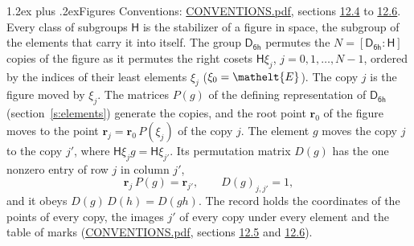 \documentclass[10pt,a4paper]{article}
\makeatletter
\renewcommand\section{\@startsection{section}{1}{\z@}{-3ex plus -1ex minus -.2ex}%
  {1.2ex plus .2ex}{\normalfont\large\sffamily\bfseries\color{parttitle}}}
\numberwithin{equation}{section}
\newcommand{\eltfont}[1]{{\let\sigma\eltsigma\mathelt{#1}}}
\newcommand{\grp}[1]{\mathsf{#1}}
\newcommand{\cls}[1]{\eltfont{#1}}
\newcommand{\pointr}{\mathbf{r}}
\makeatother
\begin{document}
\section{Figures}\label{s:permutation}
Conventions: \href{../../CONVENTIONS.pdf}{CONVENTIONS.pdf}, sections \href{../../CONVENTIONS.pdf\#conv.12.4}{12.4} to \href{../../CONVENTIONS.pdf\#conv.12.6}{12.6}.
Every class of subgroups $\grp{H}$ is the stabilizer of a figure in space, the subgroup of the elements that carry it into itself. \label{n:local.orbit.size}\label{n:element.coset.least}\label{n:index.coset}The group $\grp{D_{6h}}$ permutes the $N = [\grp{D_{6h}} : \grp{H}]$ copies of the figure as it permutes the right cosets $\grp{H}\xi_j$, $j = 0, 1, \dots, N - 1$, ordered by the indices of their least elements $\xi_j$ ($\xi_0 = \cls{E}$). The copy $j$ is the figure moved by $\xi_j$. The matrices $P(g)$ of the defining representation of $\grp{D_{6h}}$ (section~\ref{s:elements}) generate the copies, and the root point $\pointr_0$ of the figure moves to the point $\pointr_j = \pointr_0\, P(\xi_j)$ of the copy $j$. \label{n:local.coset.image}The element $g$ moves the copy $j$ to the copy $j'$, where $\grp{H}\xi_j g = \grp{H}\xi_{j'}$. \label{n:local.matrix.permutation}Its permutation matrix $D(g)$ has the one nonzero entry of row $j$ in column $j'$,
\begin{equation}\label{e:perm.matrix}\pointr_j\, P(g) = \pointr_{j'}, \qquad D(g)_{j,j'} = 1,\end{equation}
and it obeys $D(g)\, D(h) = D(gh)$. The record holds the coordinates of the points of every copy, the images $j'$ of every copy under every element and the table of marks (\href{../../CONVENTIONS.pdf}{CONVENTIONS.pdf}, sections \href{../../CONVENTIONS.pdf\#conv.12.5}{12.5} and \href{../../CONVENTIONS.pdf\#conv.12.6}{12.6}).
\end{document}
